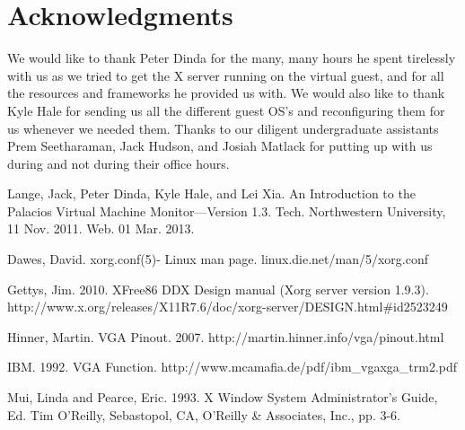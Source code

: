 \documentclass{acm_proc_article-sp}
\begin{document}
\section{Acknowledgments}
We would like to thank Peter Dinda for the many, many hours he spent tirelessly with us as we
tried to get the X server running on the virtual guest, and for all the
resources and frameworks he provided us with. We would also like to thank Kyle
Hale for sending us all the different guest OS's and reconfiguring them for us
whenever we needed them. Thanks to our diligent undergraduate assistants Prem
Seetharaman, Jack Hudson, and Josiah Matlack for putting up with us during and
not during their office hours.
%
%
%
\begin{thebibliography}{1}

   Lange, Jack, Peter Dinda, Kyle Hale, and Lei Xia. An Introduction to the Palacios Virtual Machine Monitor---Version 1.3. Tech. Northwestern University, 11 Nov. 2011. Web. 01 Mar. 2013.
	
   Dawes, David. xorg.conf(5)- Linux man page. linux.die.net/man/5/xorg.conf

   Gettys, Jim. 2010. XFree86 DDX Design manual (Xorg server version 1.9.3). http://www.x.org/releases/X11R7.6/doc/xorg-server/DESIGN.html\#id2523249
  
   Hinner, Martin. VGA Pinout. 2007. http://martin.hinner.info/vga/pinout.html

   IBM. 1992. VGA Function. http://www.mcamafia.de/pdf/ibm\_vgaxga\_trm2.pdf 
  
   Mui, Linda and Pearce, Eric. 1993. X Window System Administrator's Guide, Ed. Tim O'Reilly, Sebastopol, CA, O'Reilly \& Associates, Inc., pp. 3-6. 
  
  
  \end{thebibliography}
\balancecolumns
\end{document}
